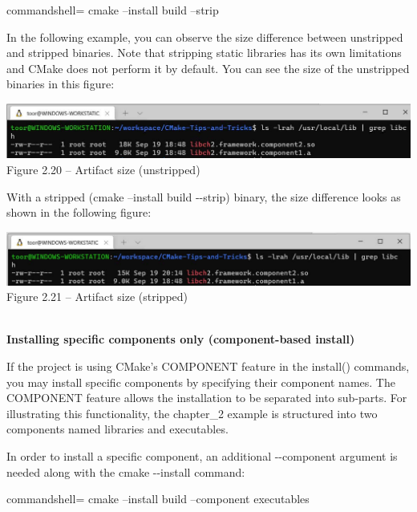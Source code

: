 \begin{tcblisting}{commandshell={}}
cmake --install build --strip
\end{tcblisting}

In the following example, you can observe the size difference between unstripped and stripped binaries. Note that stripping static libraries has its own limitations and CMake does not perform it by default. You can see the size of the unstripped binaries in this figure:

\begin{center}
\includegraphics[width=1.\textwidth]{content/1/chapter2/images/20.jpg}\\
Figure 2.20 – Artifact size (unstripped)
\end{center}

With a stripped (cmake –install build -{}-strip) binary, the size difference looks as shown in the following figure:

\begin{center}
\includegraphics[width=1.\textwidth]{content/1/chapter2/images/21.jpg}\\
Figure 2.21 – Artifact size (stripped)
\end{center}

\hspace*{\fill} \\ %
\noindent
\textbf{Installing specific components only (component-based install)}

If the project is using CMake's COMPONENT feature in the install() commands, you may install specific components by specifying their component names. The COMPONENT feature allows the installation to be separated into sub-parts. For illustrating this functionality, the chapter\_2 example is structured into two components named libraries and executables.

In order to install a specific component, an additional -{}-component argument is needed along with the cmake -{}-install command:

\begin{tcblisting}{commandshell={}}
cmake --install build --component executables
\end{tcblisting}

